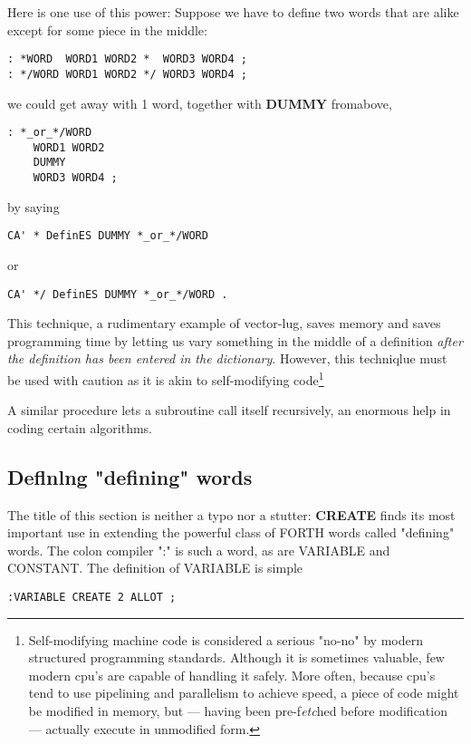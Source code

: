 Here is one use of this power: Suppose we have to define two words that are alike except for some piece in the middle:
\begin{lstlisting}
: *WORD  WORD1 WORD2 *  WORD3 WORD4 ;
: */WORD WORD1 WORD2 */ WORD3 WORD4 ;
\end{lstlisting}

we could get away with 1 word, together with \textbf{DUMMY} fromabove,

\begin{lstlisting}
: *_or_*/WORD
    WORD1 WORD2
    DUMMY
    WORD3 WORD4 ;
\end{lstlisting}
by saying
\begin{lstlisting}
CA' * DefinES DUMMY *_or_*/WORD
\end{lstlisting}

or
\begin{lstlisting}
CA' */ DefinES DUMMY *_or_*/WORD .
\end{lstlisting}

This technique, a rudimentary example of vector-lug, saves memory and saves programming time by letting us vary something in the middle of a definition \textit{after the definition has been entered in the dictionary}. However, this techniqlue must be used with caution as it is akin to self-modifying code\footnote{Self-modifying machine code is considered a serious "no-no" by modern structured programming standards. Although it is sometimes valuable, few modern cpu's are capable of handling it safely. More often, because cpu's tend to use pipelining and parallelism to achieve speed, a piece of code might be modified in memory, but — having been pre-f\textit{etc}hed before modification — actually execute in unmodified form.}


A similar procedure lets a subroutine call itself recursively, an enormous help in coding certain algorithms.

\subsection{Deﬂnlng "defining" words}

The title of this section is neither a typo nor a stutter: \textbf{CREATE} finds its most important use in extending the powerful class of FORTH words called "defining" words. The colon compiler ":" is such a word, as are VARIABLE and CONSTANT. The definition of VARIABLE is simple

\begin{lstlisting}
:VARIABLE CREATE 2 ALLOT ;
\end{lstlisting}

